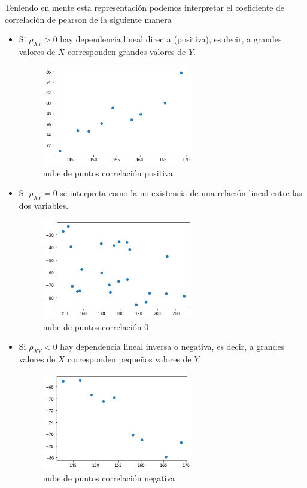 \documentclass[]{book}
\theoremstyle{plain}
\theoremstyle{definition}
\begin{document}
Teniendo en mente esta representación podemos interpretar el coeficiente de correlación de pearson de la siguiente manera

\begin{itemize}
\item
  Si \(\rho_{XY}>{0}\) hay dependencia lineal directa (positiva), es
  decir, a grandes valores de \(X\) corresponden grandes valores de
  \(Y\).

  \begin{figure}
  \centering
  \includegraphics[width=2.60417in,height=\textheight]{img/cloud.png}
  \caption{nube de puntos correlación positiva}
  \end{figure}
\item
  Si \(\rho_{XY} ={0}\) se interpreta como la no existencia de una
  relación lineal entre las dos variables.

  \begin{figure}
  \centering
  \includegraphics[width=2.60417in,height=\textheight]{img/cloud_cero.png}
  \caption{nube de puntos correlación 0}
  \end{figure}
\item
  Si \(\rho_{XY}<{0}\) hay dependencia lineal inversa o negativa, es
  decir, a grandes valores de \(X\) corresponden pequeños valores de
  \(Y\).

  \begin{figure}
  \centering
  \includegraphics[width=2.60417in,height=\textheight]{img/cloud_menos.png}
  \caption{nube de puntos correlación negativa}
  \end{figure}
\end{itemize}
\end{document}
